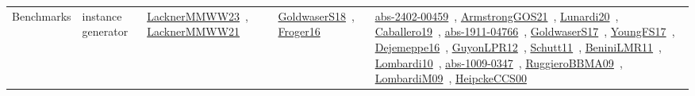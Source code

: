 {\begin{longtable}{lp{3cm}>{\raggedright\arraybackslash}p{6cm}>{\raggedright\arraybackslash}p{6cm}>{\raggedright\arraybackslash}p{8cm}}
Benchmarks & instance generator & \href{works/LacknerMMWW23.pdf}{LacknerMMWW23}~\cite{LacknerMMWW23}, \href{works/LacknerMMWW21.pdf}{LacknerMMWW21}~\cite{LacknerMMWW21} & \href{works/GoldwaserS18.pdf}{GoldwaserS18}~\cite{GoldwaserS18}, \href{works/Froger16.pdf}{Froger16}~\cite{Froger16} & \href{works/abs-2402-00459.pdf}{abs-2402-00459}~\cite{abs-2402-00459}, \href{works/ArmstrongGOS21.pdf}{ArmstrongGOS21}~\cite{ArmstrongGOS21}, \href{works/Lunardi20.pdf}{Lunardi20}~\cite{Lunardi20}, \href{works/Caballero19.pdf}{Caballero19}~\cite{Caballero19}, \href{works/abs-1911-04766.pdf}{abs-1911-04766}~\cite{abs-1911-04766}, \href{works/GoldwaserS17.pdf}{GoldwaserS17}~\cite{GoldwaserS17}, \href{works/YoungFS17.pdf}{YoungFS17}~\cite{YoungFS17}, \href{works/Dejemeppe16.pdf}{Dejemeppe16}~\cite{Dejemeppe16}, \href{works/GuyonLPR12.pdf}{GuyonLPR12}~\cite{GuyonLPR12}, \href{works/Schutt11.pdf}{Schutt11}~\cite{Schutt11}, \href{works/BeniniLMR11.pdf}{BeniniLMR11}~\cite{BeniniLMR11}, \href{works/Lombardi10.pdf}{Lombardi10}~\cite{Lombardi10}, \href{works/abs-1009-0347.pdf}{abs-1009-0347}~\cite{abs-1009-0347}, \href{works/RuggieroBBMA09.pdf}{RuggieroBBMA09}~\cite{RuggieroBBMA09}, \href{works/LombardiM09.pdf}{LombardiM09}~\cite{LombardiM09}, \href{works/HeipckeCCS00.pdf}{HeipckeCCS00}~\cite{HeipckeCCS00}\\

\end{longtable}}
